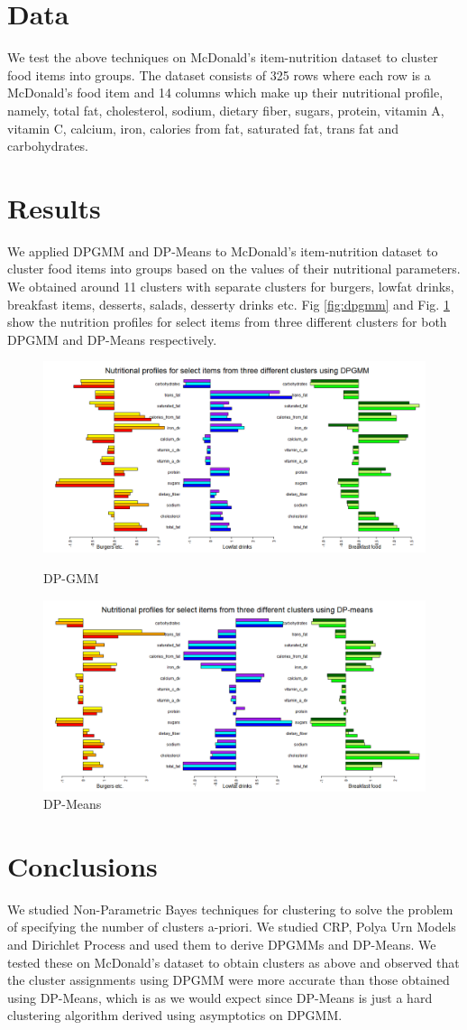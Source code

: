 \documentclass{article} %
\begin{document}
\section{Data}
We test the above techniques on McDonald's item-nutrition dataset to cluster food items into groups. The dataset consists of 325 rows where each row is a McDonald's food item and 14 columns which make up their nutritional profile, namely, total fat, cholesterol, sodium, dietary fiber, sugars, protein, vitamin A, vitamin C, calcium, iron, calories from fat, saturated fat, trans fat and carbohydrates.

\section{Results}
We applied DPGMM and DP-Means to McDonald’s item-nutrition dataset to cluster food items into groups based on the values of their nutritional parameters. We obtained around 11 clusters with separate clusters for burgers, lowfat drinks, breakfast items, desserts, salads, desserty drinks etc. Fig \ref{fig:dpgmm} and Fig. \ref{fig:dpmeans} show the nutrition profiles for select items from three different clusters for both DPGMM and DP-Means respectively.

\begin{figure}
  \centering
  \includegraphics[width=.6\linewidth]{plots/dpgmm.png}
  \caption{DP-GMM}
  \label{fig:dpgmm}
  \includegraphics[width=.6\linewidth]{plots/dpmeans.png}
  \caption{DP-Means}
  \label{fig:dpmeans}
\end{figure}


\section{Conclusions}
We studied Non-Parametric Bayes techniques for clustering to solve the problem of specifying the number of clusters a-priori. We studied CRP, Polya Urn Models and Dirichlet Process and used them to derive DPGMMs and DP-Means. We tested these on McDonald’s dataset to obtain clusters as above and observed that the cluster assignments using DPGMM were more accurate than those obtained using DP-Means, which is as we would expect since DP-Means is just a hard clustering algorithm derived using asymptotics on DPGMM.
\end{document}
